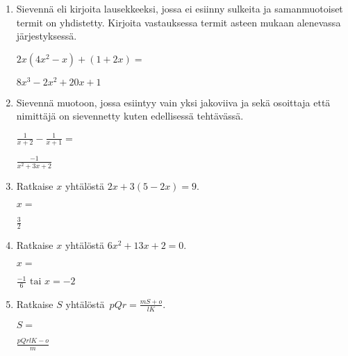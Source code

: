 \documentclass[finnish, a4paper, 12pt]{article}
\begin{document}
\begin{enumerate}[leftmargin=*]
		\vspace{8pt}
		
		\item %
		Sievennä eli kirjoita lausekkeeksi, jossa ei esiinny sulkeita ja 
		samanmuotoiset termit on yhdistetty. 
		Kirjoita vastauksessa termit asteen mukaan alenevassa järjestyksessä. 
		
		\(
		\displaystyle
		2x(4x^2 - x) + (1 + 2x) = 
		\) %
		\begin{version:withAnswers}
		\( 8x^3 -2x^2 +20x +1 \)
		\end{version:withAnswers}
		
		\vspace{8pt}
		
		\item %
		Sievennä %
		muotoon, jossa esiintyy vain yksi jakoviiva ja sekä osoittaja
		että nimittäjä on sievennetty kuten edellisessä tehtävässä.
		
		\(
		\displaystyle
		\frac{1}{x+2}- \frac{1}{x + 1} =
		\) %
		\begin{version:withAnswers}
		\( \frac{-1}{x^2+3x+2} \)
		\end{version:withAnswers}
		
		\vspace{8pt}
		
		\item %
		Ratkaise \(x\) yhtälöstä \(2x + 3(5 - 2x) = 9\).
		
		\(
		x = 
		\)	%
		\begin{version:withAnswers}
		 \( \frac{3}{2} \)
		\end{version:withAnswers}
		\vspace{8pt}
		
		\item %
		Ratkaise \(x\) yhtälöstä \(6x^2+13x+2= 0\).
		
		\(
		x = 		
		\)	%
		
		\begin{version:withAnswers}
		\(\frac{-1}{6} \text{  tai } x = -2\)
		\end{version:withAnswers}
		\vspace{8pt}
		
		\item %
		Ratkaise \(S\) yhtälöstä 
		\(
		\displaystyle \,
		pQr = \frac{mS+o}{lK} .
		\)	
		
		\(
		S = 
		\) %
		\begin{version:withAnswers}
		\( \frac{pQrlK -o}{m}\)
		\end{version:withAnswers}
		
	\end{enumerate}
	
	
\end{document}
